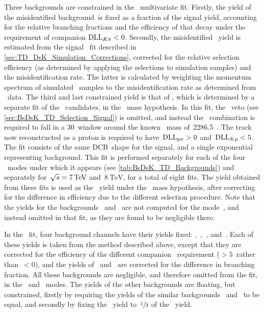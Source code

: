 Three backgrounds are constrained in the \BsDsPi~multivariate fit.
Firstly, the yield of the misidentified background~\BsDsK is fixed as a fraction of the signal yield, accounting for the relative branching fractions and the efficiency of that decay under the requirement of companion \({\text{DLL}_{{K}{\pi}} < \num{0}}\).
Secondly, the misidentified \BdDPi~yield is estimated from the signal \BdDPi~fit described in \cref{sec:TD_DsK_Simulation_Corrections}, corrected for the relative selection efficiency (as determined by applying the selections to simulation samples) and the misidentification rate.
The latter is calculated by weighting the momentum spectrum of simulated \BdDPi~samples to the misidentification rate as determined from \DstarDPi~data.
The third and last constrained yield is that of \LbLcPi, which is determined by a separate fit of the \BsDsPi~candidates, in the \LcPi~mass hypothesis.
In this fit, the \Lc~veto (see \cref{sec:BsDsK_TD_Selection_Signal}) is omitted, and instead the \PKPi~combination is required to fall in a \SI{30}{\MeVcc}~window around the known \Lc~mass of~\SI{2286.5}{\MeVcc}~\cite{PDG}.
The track now reconstructed as a proton is required to have~\({\text{DLL}_{{p}{\pi}} > \num{0}}\) and~\({\text{DLL}_{{K}{p}} < \num{5}}\).
The fit consists of the same DCB~shape for the signal, and a single exponential representing background.
This fit is performed separately for each of the four \Dsm~modes under which it appears (see \cref{tab:BsDsK_TD_Backgrounds}) and separately for~\({\sqs = \SI{7}{\TeV}}\) and~\(\SI{8}{\TeV}\), for a total of eight fits.
The yield obtained from these fits is used as the \LbLcPi~yield under the \DsmPip~mass hypothesis, after correcting for the difference in efficiency due to the different selection procedure.
Note that the yields for the backgrounds \BdDPi~and \LbLcPi~are not computed for the mode~\DsmPiPiPi, and instead omitted in that fit, as they are found to be negligible there.

In the \BsDsK~fit, four background channels have their yields fixed: \BdDK,~\BdDPi,~\LbLcK, and~\LbLcPi.
Each of these yields is taken from the method described above, except that they are corrected for the efficiency of the different companion \dllkpi~requirement (\({> \num{5}}\)~rather than~\({< \num{0}}\)), and the yields of \BdDK~and \LbLcK~are corrected for the difference in branching fraction.
All these backgrounds are negligible, and therefore omitted from the fit, in the \DsmKPiPi~and \DsmPiPiPi~modes.
The yields of the other backgrounds are floating, but constrained, firstly by requiring the yields of the similar backgrounds \BsDsstPi~and \BsDsRho~to be equal, and secondly by fixing the \LbDsstP~yield to~\(\sfrac{1}{3}\) of the \LbDsP~yield.

